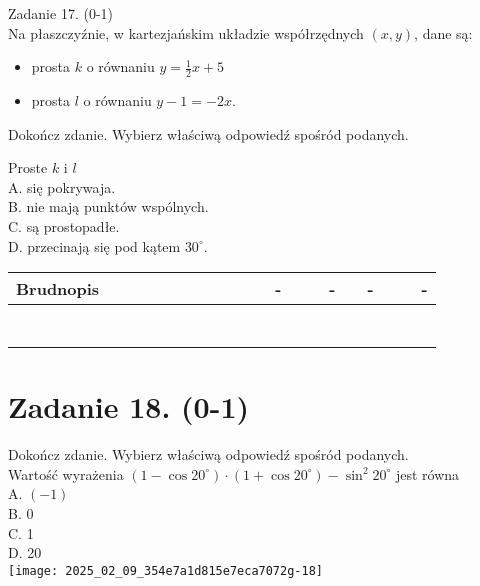 \documentclass[10pt]{article}
\begin{document}
Zadanie 17. (0-1)\\
Na płaszczyźnie, w kartezjańskim układzie współrzędnych \((x, y)\), dane są:

\begin{itemize}
  \item prosta \(k\) o równaniu \(y=\frac{1}{2} x+5\)
  \item prosta \(l\) o równaniu \(y-1=-2 x\).
\end{itemize}

Dokończ zdanie. Wybierz właściwą odpowiedź spośród podanych.

Proste \(k\) i \(l\)\\
A. się pokrywaja.\\
B. nie mają punktów wspólnych.\\
C. są prostopadłe.\\
D. przecinają się pod kątem \(30^{\circ}\).

\begin{center}
\begin{tabular}{|c|c|c|c|c|c|c|c|c|c|c|c|c|c|c|c|c|c|c|c|c|c|c|}
\hline
\multicolumn{4}{|l|}{Brudnopis} &  &  &  &  &  &  &  &  &  &  & - &  &  & - &  & - &  &  & - \\
\hline
 &  &  &  &  &  &  &  &  &  &  &  &  &  &  &  &  &  &  &  &  &  &  \\
\hline
 &  &  &  &  &  &  &  &  &  &  &  &  &  &  &  &  &  &  &  &  &  &  \\
\hline
 &  &  &  &  &  &  &  &  &  &  &  &  &  &  &  &  &  &  &  &  &  &  \\
\hline
 &  &  &  &  &  &  &  &  &  &  &  &  &  &  &  &  &  &  &  &  &  &  \\
\hline
 &  &  &  &  &  &  &  &  &  &  &  &  &  &  &  &  &  &  &  &  &  &  \\
\hline
 &  &  &  &  &  &  &  &  &  &  &  &  &  &  &  &  &  &  &  &  &  &  \\
\hline
 &  &  &  &  &  &  &  &  &  &  &  &  &  &  &  &  &  &  &  &  &  &  \\
\hline
\end{tabular}
\end{center}

\section*{Zadanie 18. (0-1)}
Dokończ zdanie. Wybierz właściwą odpowiedź spośród podanych.\\
Wartość wyrażenia \(\left(1-\cos 20^{\circ}\right) \cdot\left(1+\cos 20^{\circ}\right)-\sin ^{2} 20^{\circ}\) jest równa\\
A. \((-1)\)\\
B. 0\\
C. 1\\
D. 20\\
\texttt{[image: 2025\_02\_09\_354e7a1d815e7eca7072g-18]}
\end{document}
